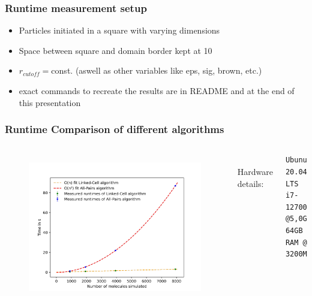 \begin{frame}
	\frametitle{Runtime measurement setup}
	\vspace{2.3cm}
		\large
		\begin{itemize}
			\setlength\itemsep{1em}
			\item<1-> Particles initiated in a square with varying dimensions
			\item<2-> Space between square and domain border kept at 10
			\item<3-> $r_{cutoff} = $const. (aswell as other variables like eps, sig, brown, etc.)
			\item<4-> exact commands to recreate the results are in README and at the end of this presentation
		\end{itemize}
		
\end{frame}


\begin{frame}[fragile]
	\frametitle{Runtime Comparison of different algorithms}
	\begin{columns}
			\vspace{-0.9cm}
			\begin{figure}
				\centering
				\includegraphics[width=\linewidth]{plot}
				\label{fig:plot}
			\end{figure}
		\\
		
		
		\large
		Hardware details:
		\begin{lstlisting}
Ubunutu 20.04 LTS
i7-12700KF @5,0GHz
64GB RAM @ 3200MHz
		\end{lstlisting}
	
	
	\end{columns}
\end{frame}


